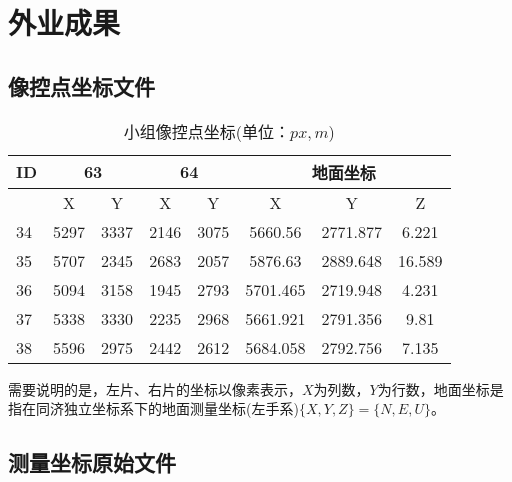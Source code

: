 \chapter{外业成果}

\section{像控点坐标文件}
\begin{table}[htbp]
    \centering
    \caption{小组像控点坐标(单位：$\si{px},\si{m}$)}
      \begin{tabular}{|l|c|c|c|c|c|c|c|}
      \hline
      ID    & \multicolumn{2}{c|}{63} & \multicolumn{2}{c|}{64} & \multicolumn{3}{c|}{地面坐标}\\
      \hline
            & X     & Y     & X     & Y     & X     & Y     & Z \\
      \hline
      34    & 5297  & 3337  & 2146  & 3075  & 5660.56 & 2771.877 & 6.221 \\
      \hline
      35    & 5707  & 2345  & 2683  & 2057  & 5876.63 & 2889.648 & 16.589 \\
      \hline
      36    & 5094  & 3158  & 1945  & 2793  & 5701.465 & 2719.948 & 4.231 \\
      \hline
      37    & 5338  & 3330  & 2235  & 2968  & 5661.921 & 2791.356 & 9.81 \\
      \hline
      38    & 5596  & 2975  & 2442  & 2612  & 5684.058 & 2792.756 & 7.135 \\
      \hline
      \end{tabular}%
    \label{tab:imgCtrlPnt}%
  \end{table}%

需要说明的是，左片、右片的坐标以像素表示，$X$为列数，$Y$为行数，地面坐标是指在同济独立坐标系下的地面测量坐标(左手系)$\{X,Y,Z\}=\{N,E,U\}$。


\section{测量坐标原始文件}

